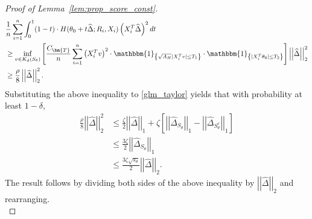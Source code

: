 \documentclass[ejsv2,noshowframe]{imsart}
\theoremstyle{plain}
\theoremstyle{definition}
\theoremstyle{remark}
\newcommand{\norm}[1]{\left|\left| #1 \right|\right|}
\renewcommand{\hat}{\widehat}
\begin{document}
\begin{proof}[Proof of Lemma~\ref{lem:prop_score_const}]
	\begin{align*}
		&\frac{1}{n} \sum_{i=1}^n \int_0^1 (1-t) \cdot H(\theta_0+t\hat{\Delta};R_i,X_i) \left(X_i^T\hat{\Delta}\right)^2 dt \\
		&\geq \inf_{v\in K_d(S_{\theta})}\left[\frac{C_{\bm{T}}}{n} \sum_{i=1}^n \left(X_i^Tv\right)^2 \cdot \mathbbm{1}_{\left\{\sqrt{A_H} |X_i^T v| \leq T_1 \right\}} \cdot \mathbbm{1}_{\left\{|X_i^T \theta_0| \leq T_2\right\}} \right] \norm{\hat{\Delta}}_2^2\\ 
		&\geq \frac{\rho}{8} \norm{\hat{\Delta}}_2^2.
	\end{align*}
	Substituting the above inequality to \eqref{glm_taylor} yields that with probability at least $1-\delta$,
	\begin{align*}
		\frac{\rho}{8} \norm{\hat{\Delta}}_2^2 & \leq \frac{\zeta}{2} \norm{\hat{\Delta}}_1 + \zeta \left[\norm{\hat{\Delta}_{S_{\theta}}}_1 - \norm{\hat{\Delta}_{S_{\theta}^c}}_1 \right]\\
		&\leq \frac{3\zeta}{2} \norm{\hat{\Delta}_{S_{\theta}}}_1\\
		&\leq \frac{3\zeta \sqrt{s_{\theta}}}{2} \norm{\hat{\Delta}}_2.
	\end{align*}
	The result follows by dividing both sides of the above inequality by $\norm{\hat{\Delta}}_2$ and rearranging.\\
	

\end{proof}
\end{document}
